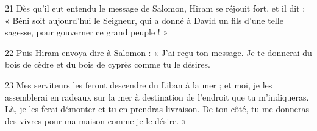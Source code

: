 
21 Dès qu’il eut entendu le message de Salomon, Hiram se réjouit fort, et il dit : « Béni soit aujourd’hui le Seigneur, qui a donné à David un fils d’une telle sagesse, pour gouverner ce grand peuple ! »

22 Puis Hiram envoya dire à Salomon : « J’ai reçu ton message. Je te donnerai du bois de cèdre et du bois de cyprès comme tu le désires.

23 Mes serviteurs les feront descendre du Liban à la mer ; et moi, je les assemblerai en radeaux sur la mer à destination de l’endroit que tu m’indiqueras. Là, je les ferai démonter et tu en prendras livraison. De ton côté, tu me donneras des vivres pour ma maison comme je le désire. »
